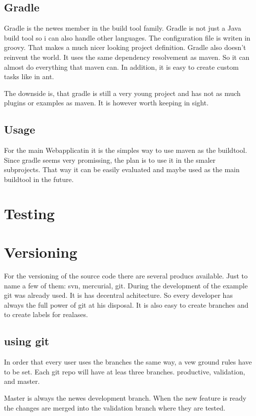 \documentclass[paper=a4,twoside=false,BCOR=0mm,DIV=calc,fontsize=12pt]{scrartcl}
\begin{document}
\subsection{Gradle}
Gradle is the newes member in the build tool family. Gradle is not just a Java build tool so i can also handle other languages. The configuration file is writen in groovy. That makes a much nicer looking project definition.
Gradle also doesn't reinvent the world. It uses the same dependency resolvement as maven. So it can almost do everything that maven can. In addition, it is easy to create custom tasks like in ant.

The downside is, that gradle is still a very young project and has not as much plugins or examples as maven. It is however worth keeping in sight.

\subsection{Usage}
For the main Webapplicatin it is the simples way to use maven as the buildtool. Since gradle seems very promissing, the plan is to use it in the smaler subprojects. That way it can be easily evaluated and maybe used as the main buildtool in the future.


\section{Testing}

\section{Versioning}
For the versioning of the source code there are several producs available. Just to name a few of them: svn, mercurial, git.
During the development of the example git was already used. It is has decentral achitecture. So every developer has always the full power of git at his disposal. It is also easy to create branches and to create labels for realases.

\subsection{using git}
In order that every user uses the branches the same way, a vew ground rules have to be set.
Each git repo will have at leas three branches. productive, validation, and master.

Master is always the newes development branch. When the new feature is ready the changes are merged into the validation branch where they are tested. 
\end{document}
